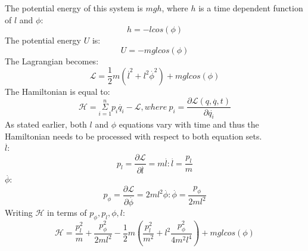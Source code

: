 \documentclass[a4paper,12pt]{article}
\newcommand{\F}[2]{\ensuremath{\frac{#1}{#2}}}
\newcommand{\vel}[1]{\overset{.}{#1}}
\newcommand{\prt}[2]{\frac{\partial#1}{\partial#2}}
\newcommand{\LP}{\left(}
\newcommand{\RP}{\right)}
\begin{document}
The potential energy of this system is $mgh$, where $h$ is a time dependent function of $l$ and $\phi$:
\[h=-lcos(\phi)\]
The potential energy $U$ is:
\[U=-mglcos(\phi)\]
The Lagrangian becomes:
\[\mathcal{L}=\F{1}{2}m(\vel{l}^2+l^2\vel{\phi}^2)+mglcos(\phi )\]
The Hamiltonian is equal to:
\[\mathcal{H}=\overset{n}{\underset{i=1}{\Sigma}}p_i\vel{q}_i-\mathcal{L},where~ p_i=\F{\partial\mathcal{L}(q,\vel{q},t)}{\partial\vel{q_i}}\]
As stated earlier, both $l$ and $\phi$ equations vary with time and thus the Hamiltonian needs to be processed with respect to both equation sets.\\
$\vel{l}$:
\[p_l=\prt{\mathcal{L}}{\vel{l}}=m\vel{l}: \vel{l}=\F{p_l}{m}\]
$\vel{\phi}$:
\[p_\phi=\prt{\mathcal{L}}{\vel{\phi}}=2ml^2\vel\phi:\vel\phi=\F{p_\phi}{2ml^2}\]
Writing $\mathcal{H}$ in terms of $p_\phi, p_l, \phi, l$:
\[\mathcal{H}=\F{p_l^2}{m}+\F{p_\phi^2}{2ml^2}-\F{1}{2}m\LP\F{p_l^2}{m^2}+l^2\F{p_\phi^2}{4m^2l^4}\RP+mglcos(\phi)\]
\end{document}
